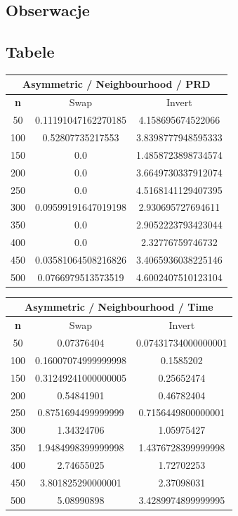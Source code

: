 \documentclass{article}
\begin{document}
\subsection{Obserwacje}

\subsection{Tabele}

\begin{center}
\begin{tabular}{|c|c|c|}
\hline
\multicolumn{3}{|c|}{\textbf{Asymmetric / Neighbourhood / PRD}}\\
\hline
\textbf{n} & Swap & Invert\\
\hline
50 & 0.11191047162270185 & 4.158695674522066\\
\hline
100 & 0.52807735217553 & 3.8398777948595333\\
\hline
150 & 0.0 & 1.4858723898734574\\
\hline
200 & 0.0 & 3.6649730337912074\\
\hline
250 & 0.0 & 4.5168141129407395\\
\hline
300 & 0.09599191647019198 & 2.930695727694611\\
\hline
350 & 0.0 & 2.9052223793423044\\
\hline
400 & 0.0 & 2.32776759746732\\
\hline
450 & 0.03581064508216826 & 3.4065936038225146\\
\hline
500 & 0.0766979513573519 & 4.6002407510123104\\
\hline
\end{tabular}
\end{center}


\begin{center}
\begin{tabular}{|c|c|c|}
\hline
\multicolumn{3}{|c|}{\textbf{Asymmetric / Neighbourhood / Time}}\\
\hline
\textbf{n} & Swap & Invert\\
\hline
50 & 0.07376404 & 0.07431734000000001\\
\hline
100 & 0.16007074999999998 & 0.1585202\\
\hline
150 & 0.31249241000000005 & 0.25652474\\
\hline
200 & 0.54841901 & 0.46782404\\
\hline
250 & 0.8751694499999999 & 0.7156449800000001\\
\hline
300 & 1.34324706 & 1.05975427\\
\hline
350 & 1.9484998399999998 & 1.4376728399999998\\
\hline
400 & 2.74655025 & 1.72702253\\
\hline
450 & 3.801825290000001 & 2.37098031\\
\hline
500 & 5.08990898 & 3.4289974899999995\\
\hline
\end{tabular}
\end{center}
\end{document}
